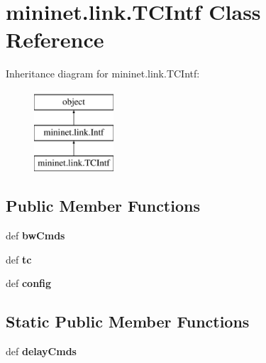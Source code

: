 \hypertarget{classmininet_1_1link_1_1TCIntf}{\section{mininet.\-link.\-T\-C\-Intf Class Reference}
\label{classmininet_1_1link_1_1TCIntf}
}
Inheritance diagram for mininet.\-link.\-T\-C\-Intf\-:\begin{figure}[H]
\begin{center}
\leavevmode
\includegraphics[height=3.000000cm]{classmininet_1_1link_1_1TCIntf}
\end{center}
\end{figure}
\subsection*{Public Member Functions}
\begin{DoxyCompactItemize}
\item 
\hypertarget{classmininet_1_1link_1_1TCIntf_a7e422dc20c9a702d693e9899f709e326}{def {\bfseries bw\-Cmds}}\label{classmininet_1_1link_1_1TCIntf_a7e422dc20c9a702d693e9899f709e326}

\item 
\hypertarget{classmininet_1_1link_1_1TCIntf_ac4371d8bff5144a4f66765084957afe6}{def {\bfseries tc}}\label{classmininet_1_1link_1_1TCIntf_ac4371d8bff5144a4f66765084957afe6}

\item 
\hypertarget{classmininet_1_1link_1_1TCIntf_a4e9cf4cb9e39771a537fa4ec717bd0a4}{def {\bfseries config}}\label{classmininet_1_1link_1_1TCIntf_a4e9cf4cb9e39771a537fa4ec717bd0a4}

\end{DoxyCompactItemize}
\subsection*{Static Public Member Functions}
\begin{DoxyCompactItemize}
\item 
\hypertarget{classmininet_1_1link_1_1TCIntf_aa75efea716cfdf857742e5a4bc5f94ae}{def {\bfseries delay\-Cmds}}\label{classmininet_1_1link_1_1TCIntf_aa75efea716cfdf857742e5a4bc5f94ae}

\end{DoxyCompactItemize}
